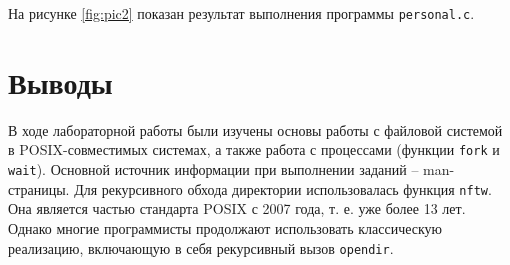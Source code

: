 

На рисунке \ref{fig:pic2} показан результат выполнения программы \lstinline{personal.c}.


\section{Выводы}
\label{sec:out}

В ходе лабораторной работы были изучены основы работы с файловой системой в POSIX-совместимых системах, а также работа с процессами (функции \lstinline{fork} и \lstinline{wait}).
Основной источник информации при выполнении заданий -- man-страницы.
Для рекурсивного обхода директории использовалась функция \lstinline{nftw}. Она является частью стандарта POSIX с 2007 года, т. е. уже более 13 лет.
Однако многие программисты продолжают использовать классическую реализацию, включающую в себя рекурсивный вызов \lstinline{opendir}.
